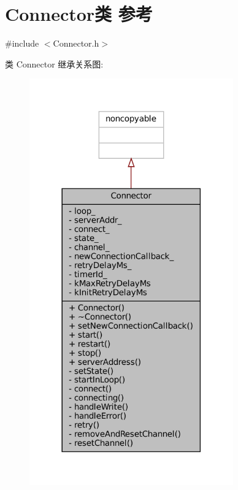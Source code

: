 \hypertarget{classmuduo_1_1Connector}{}\section{Connector类 参考}
\label{classmuduo_1_1Connector}


{\ttfamily \#include $<$Connector.\+h$>$}



类 Connector 继承关系图\+:
\nopagebreak
\begin{figure}[H]
\begin{center}
\leavevmode
\includegraphics[width=249pt]{classmuduo_1_1Connector__inherit__graph}
\end{center}
\end{figure}



